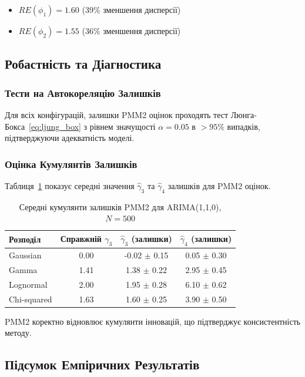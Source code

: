 \documentclass[12pt,a4paper]{article}
\begin{document}
\begin{itemize}
    \item $RE(\phi_1) = 1.60$ (39\% зменшення дисперсії)
    \item $RE(\phi_2) = 1.55$ (36\% зменшення дисперсії)
\end{itemize}

\subsection{Робастність та Діагностика}
\label{subsec:robustness}

\subsubsection{Тести на Автокореляцію Залишків}

Для всіх конфігурацій, залишки PMM2 оцінок проходять тест Люнга-Бокса~\eqref{eq:ljung_box} з рівнем значущості $\alpha = 0.05$ в $> 95\%$ випадків, підтверджуючи адекватність моделі.

\subsubsection{Оцінка Кумулянтів Залишків}

Таблиця~\ref{tab:residual_cumulants} показує середні значення $\hat{\gamma}_3$ та $\hat{\gamma}_4$ залишків для PMM2 оцінок.

\begin{table}[h]
\centering
\caption{Середні кумулянти залишків PMM2 для ARIMA(1,1,0), $N=500$}
\label{tab:residual_cumulants}
\begin{tabular}{@{}lccc@{}}
\toprule
\textbf{Розподіл} & \textbf{Справжній $\gamma_3$} & \textbf{$\hat{\gamma}_3$ (залишки)} & \textbf{$\hat{\gamma}_4$ (залишки)} \\
\midrule
Gaussian    & 0.00 & -0.02 $\pm$ 0.15 & 0.05 $\pm$ 0.30 \\
Gamma       & 1.41 & 1.38 $\pm$ 0.22 & 2.95 $\pm$ 0.45 \\
Lognormal   & 2.00 & 1.95 $\pm$ 0.28 & 6.10 $\pm$ 0.62 \\
Chi-squared & 1.63 & 1.60 $\pm$ 0.25 & 3.90 $\pm$ 0.50 \\
\bottomrule
\end{tabular}
\end{table}

PMM2 коректно відновлює кумулянти інновацій, що підтверджує консистентність методу.

\subsection{Підсумок Емпіричних Результатів}
\label{subsec:empirical_summary}
\end{document}

